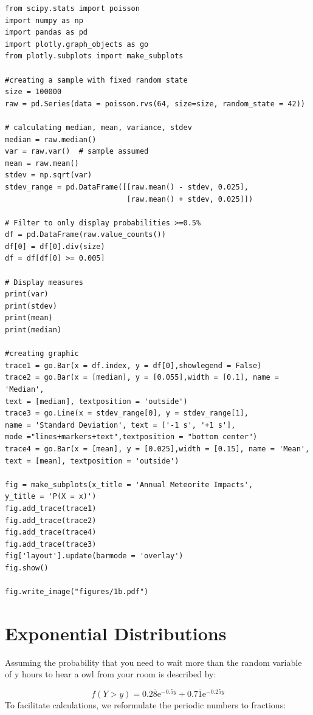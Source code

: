 \begin{verbatim}
from scipy.stats import poisson
import numpy as np
import pandas as pd
import plotly.graph_objects as go
from plotly.subplots import make_subplots

#creating a sample with fixed random state
size = 100000
raw = pd.Series(data = poisson.rvs(64, size=size, random_state = 42))

# calculating median, mean, variance, stdev
median = raw.median()
var = raw.var()  # sample assumed
mean = raw.mean()
stdev = np.sqrt(var)
stdev_range = pd.DataFrame([[raw.mean() - stdev, 0.025],
                            [raw.mean() + stdev, 0.025]])

# Filter to only display probabilities >=0.5%
df = pd.DataFrame(raw.value_counts())
df[0] = df[0].div(size)
df = df[df[0] >= 0.005]

# Display measures
print(var)
print(stdev)
print(mean)
print(median)

#creating graphic
trace1 = go.Bar(x = df.index, y = df[0],showlegend = False)
trace2 = go.Bar(x = [median], y = [0.055],width = [0.1], name = 'Median', 
text = [median], textposition = 'outside')
trace3 = go.Line(x = stdev_range[0], y = stdev_range[1], 
name = 'Standard Deviation', text = ['-1 s', '+1 s'],
mode ="lines+markers+text",textposition = "bottom center")
trace4 = go.Bar(x = [mean], y = [0.025],width = [0.15], name = 'Mean', 
text = [mean], textposition = 'outside')

fig = make_subplots(x_title = 'Annual Meteorite Impacts',
y_title = 'P(X = x)')
fig.add_trace(trace1)
fig.add_trace(trace2)
fig.add_trace(trace4)
fig.add_trace(trace3)
fig['layout'].update(barmode = 'overlay')
fig.show()

fig.write_image("figures/1b.pdf")
\end{verbatim}

\section{Exponential Distributions}
Assuming the probability that you need to wait more than the random variable of y hours to hear a owl from your room is described by:

\begin{equation}  f(Y > y) = 0.2\overline{8}\mathrm{e}^{-0.5y} + 0.7\overline{1}\mathrm{e}^{-0.25y}
\label{eq:initcdf}
\end{equation}
To facilitate calculations, we reformulate the periodic numbers to fractions:

